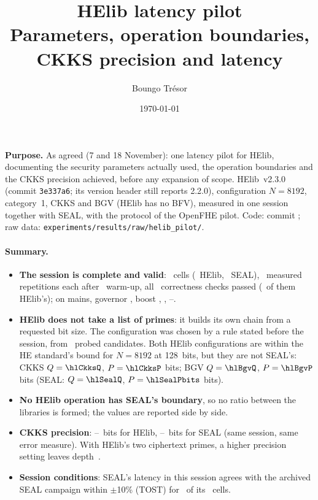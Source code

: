 \documentclass[11pt]{article}
\title{HElib latency pilot\\[2pt]
\large Parameters, operation boundaries, CKKS precision and latency}
\author{Boungo Tr\'esor}
\date{\today}
\begin{document}
\maketitle

\noindent\textbf{Purpose.} As agreed (7 and 18 November): one latency pilot for HElib, documenting the security parameters actually used, the operation boundaries and the CKKS precision achieved, before any expansion of scope. HElib~v2.3.0 (commit \texttt{3e337a6}; its version header still reports 2.2.0), configuration $N{=}8192$, category~1, CKKS and BGV (HElib has no BFV), measured in one session together with SEAL, with the protocol of the OpenFHE pilot. Code: commit \texttt{\hlCommit}; raw data: \texttt{experiments/results/raw/helib\_pilot/}.

\paragraph{Summary.}
\begin{itemize}[leftmargin=*, itemsep=2pt]
  \item \textbf{The session is complete and valid}: \hlCells\ cells (\hlHelibCells\ HElib, \hlSealCells\ SEAL), \hlReps\ measured repetitions each after \hlWarm\ warm-up, all \hlAllChecks\ correctness checks passed (\hlHelibChecks\ of them HElib's); on mains, governor \hlGovernor, boost \hlBoost, \hlDate, \hlStart--\hlEnd.
  \item \textbf{HElib does not take a list of primes}: it builds its own chain from a requested bit size. The configuration was chosen by a rule stated before the session, from \hlProbeCandidates\ probed candidates. Both HElib configurations are within the HE standard's bound for $N{=}8192$ at 128~bits, but they are not SEAL's: CKKS $Q = \hlCkksQ$, $P = \hlCkksP$ bits; BGV $Q = \hlBgvQ$, $P = \hlBgvP$ bits (SEAL: $Q = \hlSealQ$, $P = \hlSealPbits$ bits).
  \item \textbf{No HElib operation has SEAL's boundary}, so no ratio between the libraries is formed; the values are reported side by side.
  \item \textbf{CKKS precision}: \hlPrecHelibMin--\hlPrecHelibMax\ bits for HElib, \hlPrecSealMin--\hlPrecSealMax\ bits for SEAL (same session, same error measure). With HElib's two ciphertext primes, a higher precision setting leaves depth~\hlProbeHighPrecDepth.
  \item \textbf{Session conditions}: SEAL's latency in this session agrees with the archived SEAL campaign within $\pm$10\% (TOST) for \hlReproEq\ of its \hlReproN\ cells.
\end{itemize}
\end{document}
